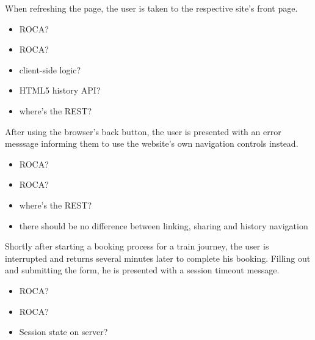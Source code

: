 \documentclass{beamer}
\newcommand{\rocafail}{\ding{55}}
\begin{document}
\begin{frame}
  When refreshing the page, the user is taken to the respective site's front page.

  \vspace{0.3cm}
  \begin{itemize}
    \item<1|only@1>[\Large $\square$] \Large ROCA?
    \item<2|only@2>[\Large \rocafail] \Large ROCA?
    \item<2> client-side logic?
    \item<2> HTML5 history API?
    \item<2> where's the REST?
  \end{itemize}

\end{frame}

\begin{frame}
  After using the browser's back button, the user is presented with an error
  messsage informing them to use the website's own navigation controls instead.

  \vspace{0.3cm}
  \begin{itemize}
    \item<1|only@1>[\Large $\square$] \Large ROCA?
    \item<2|only@2>[\Large \rocafail] \Large ROCA?
    \item<2> where's the REST?
    \item<2> there should be no difference between linking, sharing and history navigation
  \end{itemize}

\end{frame}

\begin{frame}
  Shortly after starting a booking process for a train journey, the user is
  interrupted and returns several minutes later to complete his booking. Filling
  out and submitting the form, he is presented with a session timeout message.

  \vspace{0.3cm}
  \begin{itemize}
    \item<1|only@1>[\Large $\square$] \Large ROCA?
    \item<2|only@2>[\Large \rocafail] \Large ROCA?
    \item<2> Session state on server?
  \end{itemize}

\end{frame}
\end{document}
